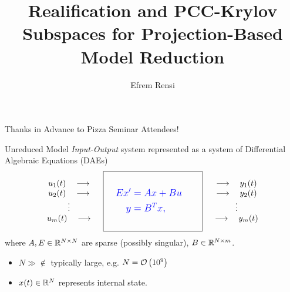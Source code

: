 \documentclass[serif]{beamer}
\title[PCC-Krylov (Grad Seminar)] %
{Realification and PCC-Krylov Subspaces for Projection-Based Model Reduction}
\author[]{Efrem Rensi}
\institute{UC Davis Mathematics (GGAM)}
\newcommand{\Balert}[1]{\textcolor{blue}{#1}}
\begin{document}
\begin{frame}
  \titlepage
\end{frame}



\begin{frame}{Thanks  in Advance to Pizza Seminar Attendees!}
 \begin{figure}
  	    \centering
  \end{figure}
\end{frame}


\begin{frame}{Unreduced Model}
   \emph{Input-Output} system represented as a system of 
   Differential Algebraic Equations (DAEs)
   \begin{equation*}  
   \begin{array}{c}
   u_1(t)\quad\longrightarrow \\ u_2(t)\quad\longrightarrow\\ \vdots\\u_\nin(t)\quad\longrightarrow
   \end{array}
  \quad
  \boxed{\large\Balert{%
 	    \begin{aligned}
 	    \\
 			\quad E x' &=  Ax + Bu\quad\\
 			y &= B^Tx,\\
 			\\
 		\end{aligned}
		}
      }
  \quad	
		 \begin{array}{c}
	 \longrightarrow\quad y_1(t)\\ \longrightarrow\quad y_2(t)\\ \vdots\\\longrightarrow\quad y_\nin(t)
   \end{array} 
 \end{equation*}
 where $A,E\in\mathbb{R}^{N\times N}$ are sparse (possibly singular), $B\in\mathbb{R}^{N\times m}$.
 
 \begin{itemize}
   \item $N \gg \nin$ typically large, e.g. $N=\mathcal{O}\left( 10^{9} \right)$
   \item $x(t)\in\mathbb{R}^N$  represents internal state.
   \end{itemize}
 \end{frame}
\end{document}
